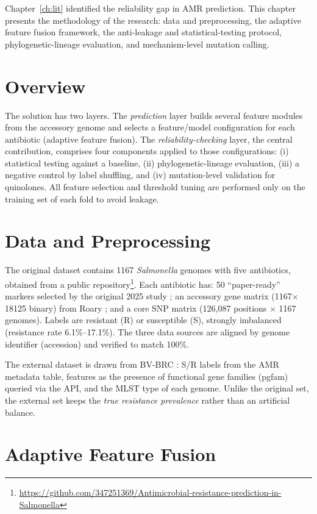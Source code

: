 \documentclass[../main.tex]{subfiles}
\begin{document}
Chapter~\ref{ch:lit} identified the reliability gap in AMR prediction. This chapter presents the methodology of the research: data and preprocessing, the adaptive feature fusion framework, the anti-leakage and statistical-testing protocol, phylogenetic-lineage evaluation, and mechanism-level mutation calling.

\section{Overview}

The solution has two layers. The \textit{prediction} layer builds several feature modules from the accessory genome and selects a feature/model configuration for each antibiotic (adaptive feature fusion). The \textit{reliability-checking} layer, the central contribution, comprises four components applied to those configurations: (i) statistical testing against a baseline, (ii) phylogenetic-lineage evaluation, (iii) a negative control by label shuffling, and (iv) mutation-level validation for quinolones. All feature selection and threshold tuning are performed only on the training set of each fold to avoid leakage.

\section{Data and Preprocessing}

The original dataset contains 1167 \textit{Salmonella} genomes with five antibiotics, obtained from a public repository\footnote{\url{https://github.com/347251369/Antimicrobial-resistance-prediction-in-Salmonella}}. Each antibiotic has: 50 ``paper-ready'' markers selected by the original 2025 study \cite{baseline2025}; an accessory gene matrix (1167$\times$18125 binary) from Roary \cite{page2015roary}; and a core SNP matrix (126{,}087 positions $\times$ 1167 genomes). Labels are resistant (R) or susceptible (S), strongly imbalanced (resistance rate 6.1\%--17.1\%). The three data sources are aligned by genome identifier (accession) and verified to match 100\%.

The external dataset is drawn from BV-BRC \cite{olson2023bvbrc}: S/R labels from the AMR metadata table, features as the presence of functional gene families (pgfam) queried via the API, and the MLST type of each genome. Unlike the original set, the external set keeps the \textit{true resistance prevalence} rather than an artificial balance.

\section{Adaptive Feature Fusion}
\end{document}
